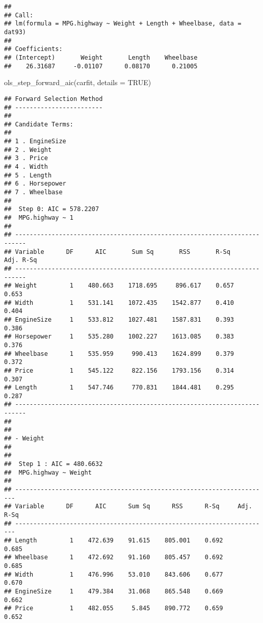 \documentclass[
]{book}
\newenvironment{Shaded}{\begin{snugshade}}{\end{snugshade}}
\newcommand{\AttributeTok}[1]{\textcolor[rgb]{0.77,0.63,0.00}{#1}}
\newcommand{\ConstantTok}[1]{\textcolor[rgb]{0.00,0.00,0.00}{#1}}
\newcommand{\FunctionTok}[1]{\textcolor[rgb]{0.00,0.00,0.00}{#1}}
\newcommand{\NormalTok}[1]{#1}
\begin{document}
\begin{verbatim}
## 
## Call:
## lm(formula = MPG.highway ~ Weight + Length + Wheelbase, data = dat93)
## 
## Coefficients:
## (Intercept)       Weight       Length    Wheelbase  
##    26.31687     -0.01107      0.08170      0.21005
\end{verbatim}

\begin{Shaded}
\begin{Highlighting}[]
\FunctionTok{ols\_step\_forward\_aic}\NormalTok{(carfit, }\AttributeTok{details =} \ConstantTok{TRUE}\NormalTok{)}
\end{Highlighting}
\end{Shaded}

\begin{verbatim}
## Forward Selection Method 
## ------------------------
## 
## Candidate Terms: 
## 
## 1 . EngineSize 
## 2 . Weight 
## 3 . Price 
## 4 . Width 
## 5 . Length 
## 6 . Horsepower 
## 7 . Wheelbase 
## 
##  Step 0: AIC = 578.2207 
##  MPG.highway ~ 1 
## 
## -------------------------------------------------------------------------
## Variable      DF      AIC       Sum Sq       RSS       R-Sq     Adj. R-Sq 
## -------------------------------------------------------------------------
## Weight         1    480.663    1718.695     896.617    0.657        0.653 
## Width          1    531.141    1072.435    1542.877    0.410        0.404 
## EngineSize     1    533.812    1027.481    1587.831    0.393        0.386 
## Horsepower     1    535.280    1002.227    1613.085    0.383        0.376 
## Wheelbase      1    535.959     990.413    1624.899    0.379        0.372 
## Price          1    545.122     822.156    1793.156    0.314        0.307 
## Length         1    547.746     770.831    1844.481    0.295        0.287 
## -------------------------------------------------------------------------
## 
## 
## - Weight 
## 
## 
##  Step 1 : AIC = 480.6632 
##  MPG.highway ~ Weight 
## 
## ----------------------------------------------------------------------
## Variable      DF      AIC      Sum Sq      RSS      R-Sq     Adj. R-Sq 
## ----------------------------------------------------------------------
## Length         1    472.639    91.615    805.001    0.692        0.685 
## Wheelbase      1    472.692    91.160    805.457    0.692        0.685 
## Width          1    476.996    53.010    843.606    0.677        0.670 
## EngineSize     1    479.384    31.068    865.548    0.669        0.662 
## Price          1    482.055     5.845    890.772    0.659        0.652 

\end{verbatim}
\end{document}
